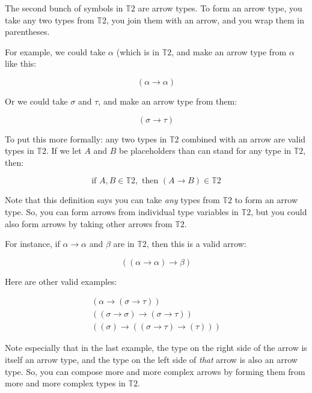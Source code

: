 \documentclass{book}
\numberwithin{equation}{chapter}
\begin{document}
The second bunch of symbols in $\mathbb{T}2$ are arrow types. To form an arrow type, you take any two types from $\mathbb{T}2$, you join them with an arrow, and you wrap them in parentheses.

For example, we could take $\alpha$ (which is in $\mathbb{T}2$, and make an arrow type from $\alpha$ like this:

\begin{equation}
(\alpha \rightarrow \alpha)
\end{equation}

\noindent
Or we could take $\sigma$ and $\tau$, and make an arrow type from them:

\begin{equation}
(\sigma \rightarrow \tau)
\end{equation}

\noindent
To put this more formally: any two types in $\mathbb{T}2$ combined with an arrow are valid types in $\mathbb{T}2$. If we let $A$ and $B$ be placeholders than can stand for any type in $\mathbb{T}2$, then:

\begin{equation}
\text{if } A, B \in \mathbb{T}2, \text{ then } (A \rightarrow B) \in \mathbb{T}2
\end{equation}

\noindent
Note that this definition says you can take \textit{any} types from $\mathbb{T}2$ to form an arrow type. So, you can form arrows from individual type variables in $\mathbb{T}2$, but you could also form arrows by taking other arrows from $\mathbb{T}2$.

For instance, if $\alpha \rightarrow \alpha$ and $\beta$ are in $\mathbb{T}2$, then this is a valid arrow:

\begin{equation}
((\alpha \rightarrow \alpha) \rightarrow \beta)
\end{equation}

\noindent
Here are other valid examples:

\begin{align}
  (\alpha \rightarrow (\sigma \rightarrow \tau)) \\
  ((\sigma \rightarrow \sigma) \rightarrow (\sigma \rightarrow \tau)) \\
  ((\sigma) \rightarrow ((\sigma \rightarrow \tau) \rightarrow (\tau)))
\end{align}

\noindent
Note especially that in the last example, the type on the right side of the arrow is itself an arrow type, and the type on the left side of \textit{that} arrow is also an arrow type. So, you can compose more and more complex arrows by forming them from more and more complex types in $\mathbb{T}2$.
\end{document}
